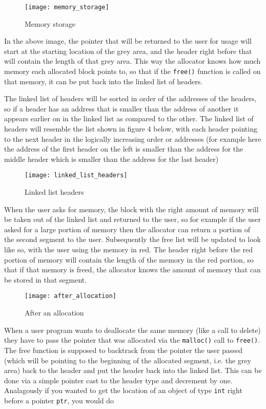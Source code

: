 \documentclass{article}
\begin{document}
\begin{figure}[!htb]
\centering
\texttt{[image: memory\_storage]}
\caption{Memory storage}
\end{figure}

In the above image, the pointer that will be returned to the user for usage
will start at the starting location of the grey area, and the header right
before that will contain the length of that grey area.  This way the allocator
knows how much memory each allocated block points to, so that if the
\texttt{free()} function is called on that memory, it can be put back into the
linked list of headers.

The linked list of headers will be sorted in order of the addresses of the
headers, so if a header has an address that is smaller than the address of
another it appears earlier on in the linked list as compared to the other.
The linked list of headers will resemble the list shown in figure 4 below,
with each header pointing to the next header in the logically increasing order
or addresses (for example here the address of the first header on the left is
smaller than the address for the middle header which is smaller than the
address for the last header)

\begin{figure}[!htb]
\centering
\texttt{[image: linked\_list\_headers]}
\caption{Linked list headers}
\end{figure}

When the user asks for memory, the block with the right amount of memory will
be taken out of the linked list and returned to the user, so for example if
the user asked for a large portion of memory then the allocator can
return a portion of the second segment to the user.  Subsequently the free
list will be updated to look like so, with the user using the memory in red.
The header right before the red portion of memory will contain the length of
the memory in the red portion, so that if that memory is freed, the allocator
knows the amount of memory that can be stored in that segment.

\begin{figure}[!htb]
\centering
\texttt{[image: after\_allocation]}
\caption{After an allocation}
\end{figure}

When a user program wants to deallocate the same memory (like a call to
delete) they have to pass the pointer that was allocated via the
\texttt{malloc()} call to \texttt{free()}.  The free function is supposed to
backtrack from the pointer the user passed (which will be pointing to the
beginning of the allocated segment, i.e.  the grey area) back to the header
and put the header back into the linked list.  This can be done via a simple
pointer cast to the header type and decrement by one.  Analagously if you
wanted to get the location of an object of type \texttt{int} right before a
pointer \texttt{ptr}, you would do
\end{document}
